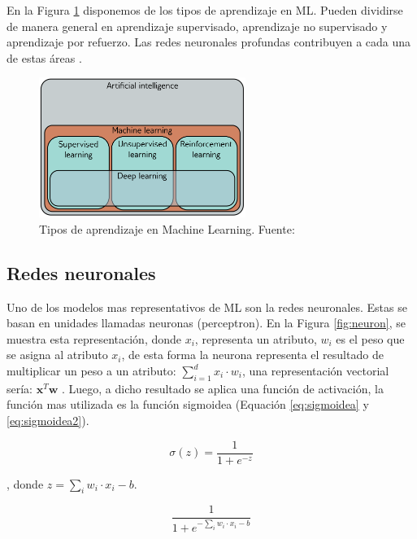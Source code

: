 En la Figura \ref{fig:ml} disponemos de los tipos de aprendizaje en ML. Pueden dividirse de manera general en aprendizaje supervisado, aprendizaje no supervisado y aprendizaje por refuerzo. Las redes neuronales profundas contribuyen a cada una de estas áreas \cite{prince2023understanding}.

\begin{figure}[H]
	\centering
	\includegraphics[width=0.6\textwidth]{../img/theory/ml}	
	\caption{Tipos de aprendizaje en Machine Learning. Fuente: \citep{prince2023understanding} }
	\label{fig:ml}
\end{figure}





\subsection{Redes neuronales}

Uno  de los modelos mas representativos de ML son la redes neuronales. Estas se basan en unidades llamadas neuronas (perceptron). En la Figura \ref{fig:neuron}, se muestra esta representación, donde $x_i$, representa un atributo, $w_i$ es el peso que se asigna al atributo $x_i$, de esta forma la neurona representa el resultado de multiplicar un peso a un atributo: $\sum_{i=1}^{d} x_i \cdot w_i$, una representación vectorial sería: $\textbf{x}^T\textbf{w}$ \citep{nielsen2015neural}. Luego, a dicho resultado se aplica una función de activación, la función mas utilizada es la función sigmoidea (Equación \ref{eq:sigmoidea} y \ref{eq:sigmoidea2}).  

\begin{equation}\label{eq:sigmoidea}
	\sigma (z) = \frac{1}{1 + e^{-z}}
\end{equation}

, donde $z = \sum_{i}^{} w_i \cdot x_i - b$.

\begin{equation}\label{eq:sigmoidea2}
	\frac{1}{1 + e^{-\sum_{i}^{} w_i \cdot x_i - b}}
\end{equation}

